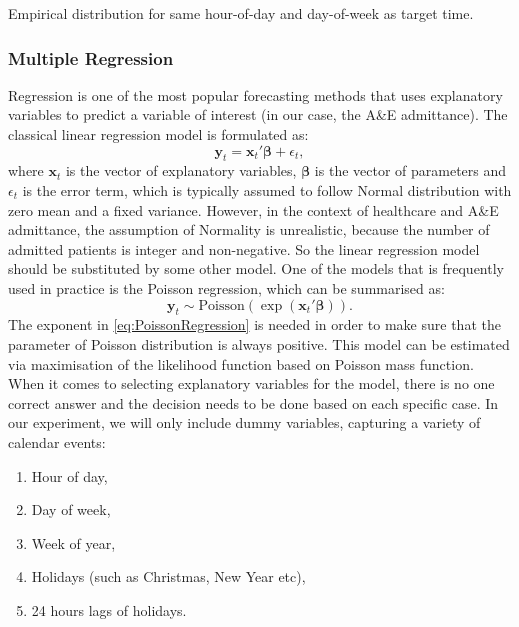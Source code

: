 \documentclass[]{elsarticle} %
\providecommand{\tightlist}{%
  \setlength{\itemsep}{0pt}\setlength{\parskip}{0pt}}
\begin{document}
Empirical distribution for same hour-of-day and day-of-week as target time.

\hypertarget{multiple-regression}{%
\subsubsection{Multiple Regression}\label{multiple-regression}}

Regression is one of the most popular forecasting methods that uses explanatory variables to predict a variable of interest (in our case, the A\&E admittance). The classical linear regression model is formulated as:
\begin{equation}
  \mathbf{y}_t = \mathbf{x}_t' \boldsymbol{\beta} + \epsilon_t ,
\label{eq:linearRegression}
\end{equation}
where \(\mathbf{x}_t\) is the vector of explanatory variables, \(\boldsymbol{\beta}\) is the vector of parameters and \(\epsilon_t\) is the error term, which is typically assumed to follow Normal distribution with zero mean and a fixed variance. However, in the context of healthcare and A\&E admittance, the assumption of Normality is unrealistic, because the number of admitted patients is integer and non-negative. So the linear regression model should be substituted by some other model. One of the models that is frequently used in practice is the Poisson regression, which can be summarised as:
\begin{equation}
  \mathbf{y}_t \sim \mathrm{Poisson} \left( \exp \left( \mathbf{x}_t' \boldsymbol{\beta} \right) \right).
\label{eq:PoissonRegression}
\end{equation}
The exponent in \eqref{eq:PoissonRegression} is needed in order to make sure that the parameter of Poisson distribution is always positive. This model can be estimated via maximisation of the likelihood function based on Poisson mass function. When it comes to selecting explanatory variables for the model, there is no one correct answer and the decision needs to be done based on each specific case. In our experiment, we will only include dummy variables, capturing a variety of calendar events:

\begin{enumerate}
\def\labelenumi{\arabic{enumi}.}
\tightlist
\item
  Hour of day,
\item
  Day of week,
\item
  Week of year,
\item
  Holidays (such as Christmas, New Year etc),
\item
  24 hours lags of holidays.
\end{enumerate}
\end{document}
